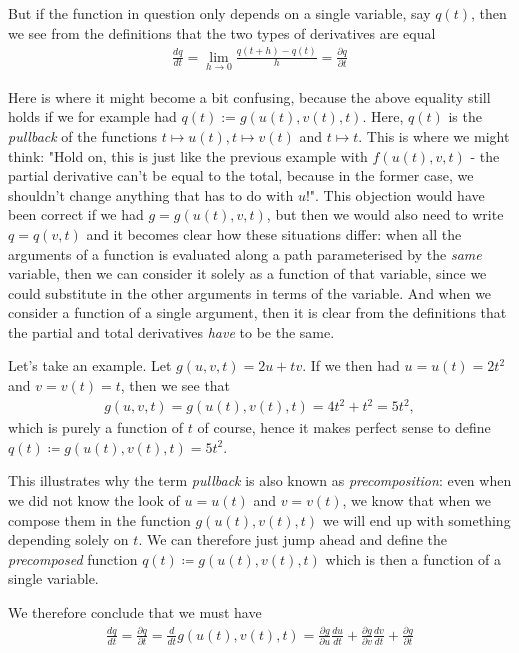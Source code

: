 \documentclass[a4paper]{article}
\begin{document}
    But if the function in question only depends on a single variable, say \(q(t)\), then we see from the definitions that the two types of derivatives are equal \begin{align*}
        \frac{dq}{dt} = \lim_{h \to 0} \frac{q(t + h) - q(t)}{h} = \frac{\partial q}{\partial t} 
    \end{align*}

    Here is where it might become a bit confusing, because the above equality still holds if we for example had \(q(t) := g(u(t), v(t), t)\). Here, \(q(t)\) is the \textit{pullback} of the functions \(t\mapsto u(t), t\mapsto v(t)\) and \(t \mapsto t\). This is where we might think: "Hold on, this is just like the previous example with \(f(u(t), v, t)\) - the partial derivative can't be equal to the total, because in the former case, we shouldn't change anything that has to do with \(u\)!". This objection would have been correct if we had \(g = g(u(t), v, t)\), but then we would also need to write \(q = q(v, t)\) and it becomes clear how these situations differ: when all the arguments of a function is evaluated along a path parameterised by the \textit{same} variable, then we can consider it solely as a function of that variable, since we could substitute in the other arguments in terms of the variable. And when we consider a function of a single argument, then it is clear from the definitions that the partial and total derivatives \textit{have} to be the same.

    Let's take an example. Let \(g(u, v, t) = 2u + tv\). If we then had \(u = u(t) = 2t^2\) and \(v = v(t) = t\), then we see that \begin{align*}
        g(u, v, t) = g(u(t), v(t), t) = 4 t^2 + t^2 = 5t^2,
    \end{align*}  
    which is purely a function of \(t\) of course, hence it makes perfect sense to define \(q(t) \coloneqq g(u(t), v(t), t) = 5t^2\).

    This illustrates why the term \textit{pullback} is also known as \textit{precomposition}: even when we did not know the look of \(u = u(t)\) and \(v = v(t)\), we know that when we compose them in the function \(g(u(t), v(t), t)\) we will end up with something depending solely on \(t\). We can therefore just jump ahead and define the \textit{precomposed} function \(q(t) \coloneqq g(u(t), v(t), t)\) which is then a function of a single variable.

    We therefore conclude that we must have \begin{align*}
        \frac{dq}{dt} = \frac{\partial q}{\partial t} = \frac{d}{dt}g(u(t), v(t), t) = \frac{\partial g}{\partial u} \frac{du}{dt} + \frac{\partial g}{\partial v}\frac{dv}{dt} + \frac{\partial g}{\partial t}
    \end{align*}
    
\end{document}
